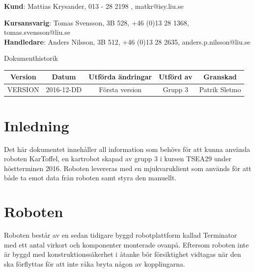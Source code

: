 \documentclass{article}
\begin{document}
\begin{center}
\textbf{Kund}: Mattias Krysander, 013 - 28 2198 , matkr@isy.liu.se
\end{center}

\begin{center}
\textbf{Kursansvarig}: Tomas Svensson, 3B 528, +46 (0)13 28 1368, tomas.svensson@liu.se \\
\textbf{Handledare}: Anders Nilsson, 3B 512, +46 (0)13 28 2635, anders.p.nilsson@liu.se
\end{center}
\vspace*{\fill}
\clearpage

\renewcommand*\contentsname{Innehållsförteckning}
\tableofcontents
\clearpage


{
\sffamily
\centering
\large


{\huge 
Dokumenthistorik \\
}
\begin{table}[H]
\centering
\begin{tabular}{ | c | c | c | c | c |} 
\hline
\textbf{Version} & \textbf{Datum} & \textbf{Utförda ändringar} & \textbf{Utförd av } & \textbf{Granskad} \\
\hline
VERSION & 2016-12-DD & Första version & Grupp 3 & Patrik Sletmo \\
\hline

\end{tabular}
\end{table}
}

\clearpage
\section{Inledning}
Det här dokumentet innehåller all information som behövs för att kunna använda roboten KarToffel, en kartrobot skapad av grupp 3 i kursen TSEA29 under höstterminen 2016. Roboten levereras med en mjukvaruklient som används för att både ta emot data från roboten samt styra den manuellt. 


\clearpage
\section{Roboten}
Roboten består av en sedan tidigare byggd robotplattform kallad Terminator med ett antal virkort och komponenter monterade ovanpå. Eftersom roboten inte är byggd med konstruktionssäkerhet i åtanke bör försiktighet vidtagas när den ska förflyttas för att inte råka bryta någon av kopplingarna.
\end{document}
